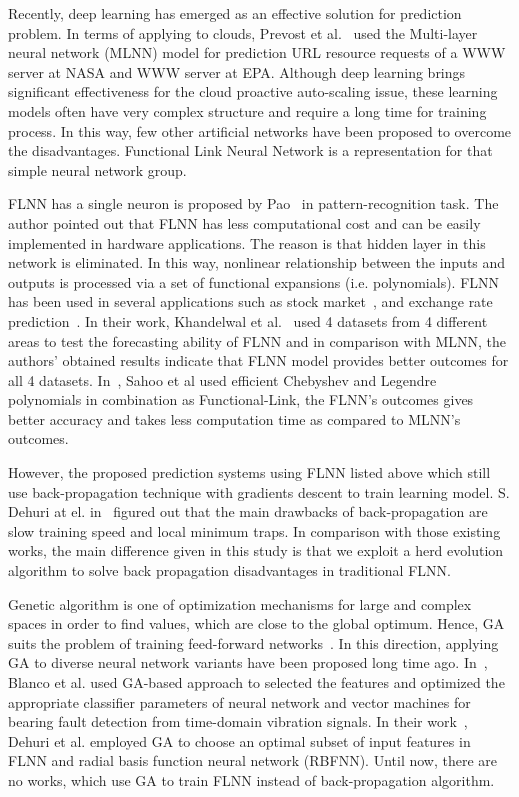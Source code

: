 \documentclass[conference]{IEEEtran}
\begin{document}
Recently, deep learning has emerged as an effective solution for prediction problem. In terms of applying to clouds, Prevost et al.~\cite{ref_prevost} used the Multi-layer neural network (MLNN) model for prediction URL resource requests of a WWW server at NASA and WWW server at EPA. Although deep learning brings significant effectiveness for the cloud proactive auto-scaling issue, these learning models often have very complex structure and require a long time for training process. In this way, few other artificial networks have been proposed to overcome the disadvantages. Functional Link Neural Network is a representation for that simple neural network group.

FLNN has a single neuron is proposed by Pao~\cite{ref_pao} in pattern-recognition task. The author pointed out that FLNN has less computational cost and can be easily implemented in hardware applications. The reason is that hidden layer in this network is eliminated. In this way, nonlinear relationship between the inputs and outputs is processed via a set of functional expansions (i.e. polynomials). FLNN has been used in several applications such as stock market~\cite{ref_majhi}, and exchange rate prediction~\cite{ref_rout}. In their work, Khandelwal et al.~\cite{ref_khan} used 4 datasets from 4 different areas to test the forecasting ability of FLNN and in comparison with MLNN, the authors' obtained results indicate that FLNN model provides better outcomes for all 4 datasets. In~\cite{ref_sahoo}, Sahoo et al used efficient Chebyshev and Legendre polynomials in combination as Functional-Link, the FLNN's outcomes gives better accuracy and takes less computation time as compared to MLNN's outcomes.

However, the proposed prediction systems using FLNN listed above which still use back-propagation technique with gradients descent to train learning model. S. Dehuri at el. in~\cite{ref_dehuri} figured out that the main drawbacks of back-propagation are slow training speed and local minimum traps. In comparison with those existing works, the main difference given in this study is that we exploit a herd evolution algorithm to solve back propagation disadvantages in traditional FLNN. 

Genetic algorithm is one of optimization mechanisms for large and complex spaces in order to find values, which are close to the global optimum. Hence, GA suits the problem of training feed-forward networks~\cite{ref_motana}. In this direction, applying GA to diverse neural network variants have been proposed long time ago. In~\cite{ref_blanco}, Blanco et al. used GA-based approach to selected the features and optimized the appropriate classifier parameters of neural network and vector machines for bearing fault detection from time-domain vibration signals. In their work~\cite{ref_dehuri_2}, Dehuri et al. employed GA to choose an optimal subset of input features in FLNN and radial basis function neural network (RBFNN). Until now, there are no works, which use GA to train FLNN instead of back-propagation algorithm. 
\end{document}
